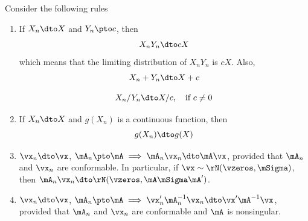 \begin{theorem}\label{teo:rules_dto}

Consider the following rules
\begin{enumerate}
  \item If $X_n\dto X$ and $Y_n\pto c$, then
      \begin{equation}\label{eq:rule_dtop}
         X_nY_n \dto cX
      \end{equation}
%
      which means that the limiting distribution of $X_nY_n$ is $cX$. Also, 
        \begin{equation}\label{eq:rule_dtop_2}
            X_n + Y_n \dto X + c
        \end{equation}
        
        \begin{equation}\label{eq:rule_dtop_3}
            X_n / Y_n \dto X / c, \quad \mbox{if $c\neq 0$}
        \end{equation}
        
    \item If $X_n\dto X$ and $g(X_n)$ is a continuous function, then
          \begin{equation}\label{eq:rule_dtop_4}
            g(X_n)\dto g(X)
          \end{equation}
    \item $\vx_n \dto \vx$, $\mA_n\pto \mA \implies \mA_n\vx_n \dto \mA\vx$, provided that $\mA_n$ and $\vx_n$ are conformable. In particular, if $\vx \sim \rN(\vzeros, \mSigma)$, then $\mA_n\vx_n\dto \rN(\vzeros, \mA\mSigma\mA')$.
    \item $\vx_n \dto \vx$, $\mA_n\pto \mA \implies \vx_n'\mA_n^{-1}\vx_n\dto \vx'\mA^{-1}\vx$, provided that $\mA_n$ and $\vx_n$ are conformable and $\mA$ is nonsingular.
\end{enumerate}
\end{theorem}

